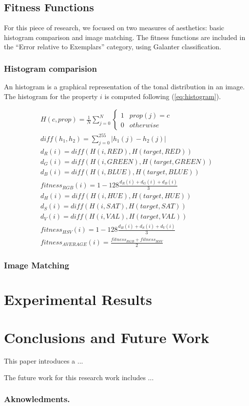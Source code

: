 \documentclass[conference]{IEEEtran}
\begin{document}
\subsection{Fitness Functions}\label{go:fitness} 
For this piece of research, we focused on two measures of aesthetics: basic histogram comparison and image matching. The fitness functions are included in the ``Error relative to Exemplars'' category, using Galanter \cite{galanter2012computational} classification.
\subsubsection{Histogram comparision}\label{go:fitness:hist}
An histogram is a graphical representation of the tonal distribution in an image. The histogram for the property $i$ is computed following (\ref{eq:histogram}).


\begin{eqnarray}
	\label{eq:fitness}
	H(c, prop) = \frac{1}{N}\sum_{j=0}^N \left\{\begin{matrix}
1 & prop(j) = c\\ 
0 & otherwise
\end{matrix}\right. \\
	diff(h_1, h_2) = \sum_{j=0}^{255} |h_1(j) - h_2(j)| \\
	d_R(i) = diff(H(i, RED), H(target, RED))\\
	d_G(i) = diff(H(i, GREEN), H(target, GREEN))\\
	d_B(i) =  diff(H(i, BLUE), H(target, BLUE))\\
	fitness_{RGB}(i) = 1 - 128\frac{d_R(i) + d_G(i) + d_B(i)}{3} \\
	d_H(i) = diff(H(i, HUE), H(target, HUE))\\
	d_S(i) = diff(H(i, SAT), H(target, SAT))\\
	d_V(i) =  diff(H(i, VAL), H(target, VAL))\\
	fitness_{HSV}(i) = 1 - 128\frac{d_H(i) + d_S(i) + d_V(i)}{3}\\	
	fitness_{AVERAGE}(i) = \frac{fitness_{RGB}+fitness_{HSV}}{2}
\end{eqnarray}

\subsubsection{Image Matching}\label{go:fitness:image_match}

\section{Experimental Results} \label{exper}

\section{Conclusions and Future Work}\label{conclusions}
This paper introduces a ...

The future work for this research work includes ...
\subsubsection*{Aknowledments.} 



\end{document}
